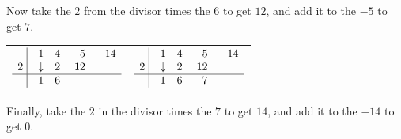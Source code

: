 \bigskip

Now take the $2$ from the divisor times the $6$ to get $12$, and add it to the $-5$ to get $7$.

\bigskip

\begin{center}

\begin{tabular}{cc}


$ \begin{array}{rrrrr}


   \, \, \vline& 1 & 4 & -5  & -14 \\

   2  \, \, \vline& \downarrow &  2  &  12  &  \\ \hline
  \vline& 1  &   6  &   &    \\  
\end{array}$ \hspace{1in}

&

$ \begin{array}{rrrrr}


   \, \, \vline& 1 & 4 & -5  & -14 \\

   2  \, \, \vline& \downarrow &  2  &  12  &  \\ \hline 
  \vline& 1  &   6  & 7  &    \\  
\end{array}$ \\


\end{tabular}

\end{center}


Finally, take the $2$ in the divisor times the $7$ to get $14$, and add it to the $-14$ to get $0$.

\bigskip

